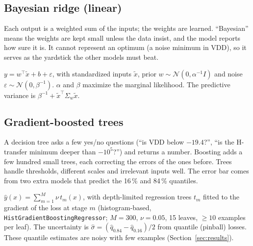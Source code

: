 \documentclass[10pt]{article}
\newcommand{\code}[1]{\texttt{#1}}
\begin{document}
\subsection{Bayesian ridge (linear)}
\begin{basic}
Each output is a weighted sum of the inputs; the weights are learned. ``Bayesian'' means the weights are kept small unless the data
insist, and the model reports how sure it is. It cannot represent an optimum (a noise minimum in VDD), so it serves as the
yardstick the other models must beat.
\end{basic}
\begin{advanced}
$y = w^\top \tilde x + b + \varepsilon$, with standardized inputs $\tilde x$, prior $w \sim \mathcal N(0, \alpha^{-1} I)$ and noise
$\varepsilon \sim \mathcal N(0, \beta^{-1})$. $\alpha$ and $\beta$ maximize the marginal likelihood. The predictive variance is
$\beta^{-1} + \tilde x^\top \Sigma_w \tilde x$.
\end{advanced}

\subsection{Gradient-boosted trees}
\begin{basic}
A decision tree asks a few yes/no questions (``is VDD below $-19.4$?'', ``is the H-transfer minimum deeper than $-10^5$?'') and
returns a number. Boosting adds a few hundred small trees, each correcting the errors of the ones before. Trees handle thresholds,
different scales and irrelevant inputs well. The error bar comes from two extra models that predict the 16\,\% and 84\,\% quantiles.
\end{basic}
\begin{advanced}
$\hat y(x) = \sum_{m=1}^{M} \nu\, t_m(x)$, with depth-limited regression trees $t_m$ fitted to the gradient of the loss at stage $m$
(histogram-based, \code{HistGradientBoostingRegressor}; $M = 300$, $\nu = 0.05$, 15 leaves, $\geq 10$ examples per leaf). The
uncertainty is $\hat\sigma = (\hat q_{0.84} - \hat q_{0.16})/2$ from quantile (pinball) losses. These quantile estimates are noisy with few
examples (Section~\ref{sec:results}).
\end{advanced}
\end{document}
